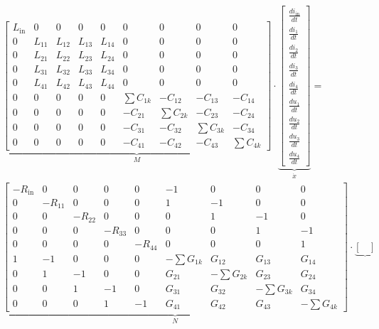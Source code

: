 \begin{refsection}
{\footnotesize 
\begin{align}
			&
			\underbrace{\begin{bmatrix}
			L_\mathrm{in}&0&0&0&0 & 0&0&0&0 \\
			0&L_{11}&L_{12}&L_{13}&L_{14} & 0&0&0&0 \\
			0&L_{21}&L_{22}&L_{23}&L_{24} & 0&0&0&0 \\
			0&L_{31}&L_{32}&L_{33}&L_{34} & 0&0&0&0 \\
			0&L_{41}&L_{42}&L_{43}&L_{44} & 0&0&0&0 \\
			0&0&0&0&0 & \sum{C_{1k}}&-C_{12}&-C_{13}&-C_{14} \\
			0&0&0&0&0 & -C_{21}&\sum{C_{2k}}&-C_{23}&-C_{24} \\
			0&0&0&0&0 & -C_{31}&-C_{32}&\sum{C_{3k}}&-C_{34} \\
			0&0&0&0&0 & -C_{41}&-C_{42}&-C_{43}&\sum{C_{4k}}
			    \end{bmatrix}}_{\text{$M$}}
			\cdot
			\underbrace{\begin{bmatrix}
			\frac{di_\mathrm{in}}{dt} \\
			\frac{di_1}{dt} \\
			\frac{di_2}{dt} \\
			\frac{di_3}{dt} \\
			\frac{di_4}{dt} \\
			\frac{du_1}{dt} \\
			\frac{du_2}{dt} \\
			\frac{du_3}{dt} \\
			\frac{du_4}{dt}
			\end{bmatrix}}_{\text{$\dot{x}$}}
			= \nonumber \\
			&
			\underbrace{\begin{bmatrix}
			-R_\mathrm{in}&0&0&0&0 & -1&0&0&0 \\
			0&-R_{11}&0&0&0 & 1&-1&0&0 \\
			0&0&-R_{22}&0&0 & 0&1&-1&0 \\
			0&0&0&-R_{33}&0 & 0&0&1&-1 \\
			0&0&0&0&-R_{44} & 0&0&0&1 \\
			1&-1&0&0&0 & -\sum G_{1k}&G_{12}&G_{13}&G_{14} \\
			0&1&-1&0&0 & G_{21} &- \sum G_{2k}& G_{23}& G_{24} \\
			0&0&1&-1&0 & G_{31} & G_{32} &-\sum G_{3k}&G_{34} \\
			0&0&0&1&-1 & G_{41}&G_{42}&G_{43}&-\sum G_{4k}
			\end{bmatrix}}_{\text{$N$}}
			\cdot
			\underbrace{\begin{bmatrix}

\end{bmatrix}}
\end{align}}
\end{refsection}
